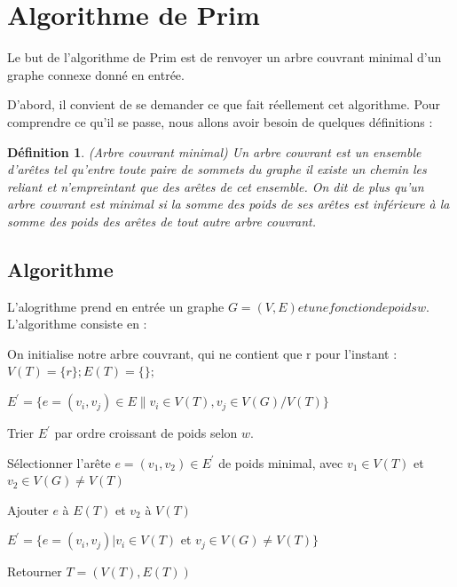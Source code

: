 \documentclass{article}
\newtheorem*{ddef}{Définition}
\begin{document}
\section{Algorithme de Prim}
Le but de l'algorithme de Prim est de renvoyer un arbre couvrant minimal d'un graphe connexe donné en entrée.

D'abord, il convient de se demander ce que fait réellement cet algorithme. Pour comprendre ce qu'il se passe, nous allons avoir besoin de quelques définitions :

\begin{ddef}(Arbre couvrant minimal)
 Un arbre couvrant est un ensemble d'arêtes tel qu'entre toute paire de sommets du graphe il existe un chemin les reliant et n'empreintant que des arêtes de cet
 ensemble.
 On dit de plus qu'un arbre couvrant est minimal si la somme des poids de ses arêtes est inférieure à la somme des poids des arêtes de tout autre arbre couvrant.
\end{ddef}

\subsection{Algorithme}

L'alogrithme prend en entrée un graphe $G = (V, E) et une fonction de poids w$. L'algorithme consiste en :

\begin{algorithmic}
\State {}

\State \Comment On initialise notre arbre couvrant, qui ne contient que r pour l'instant : $V(T) = \{r\} ; E(T) = \{\};$

\State \Comment $E^{\prime} = \{e = (v_{i}, v_{j}) \in E \| v_{i} \in V(T), v_{j} \in V(G)/V(T)\}$

\State \Comment Trier $E^{\prime}$ par ordre croissant de poids selon $w$.


\State Sélectionner l'arête  $e = (v_1, v_2) \in E^{\prime}$ de poids minimal, avec $v_1 \in V(T)$ et $v_2 \in V(G) \not= V(T)$

\State Ajouter $e$ à $E(T)$ et $v_2$ à $V(T)$

\State $E^{\prime} = \{e = (v_i, v_j)| v_i \in V(T)$ et $v_j \in V(G) \neq V(T) \}$

\EndWhile

Retourner $T = (V(T), E(T))$

\end{algorithmic}
\end{document}
